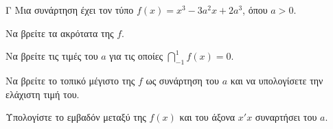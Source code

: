 \begin{thema}{Γ}
Μια συνάρτηση έχει τον τύπο $f(x) = x^3 - 3a^2 x + 2a^3$, όπου $a > 0$.
\begin{erwthma}
  \item Να βρείτε τα ακρότατα της $f$.
  \item Να βρείτε τις τιμές του $a$ για τις οποίες $\dint_{-1}^{1}{f(x)}=0$.
  \item Να βρείτε το τοπικό μέγιστο της $f$ ως συνάρτηση του $a$ και να υπολογίσετε την ελάχιστη τιμή του.
  \item Υπολογίστε το εμβαδόν μεταξύ της $f(x)$ και του άξονα $x'x$ συναρτήσει του $a$.
\end{erwthma}
\end{thema}

